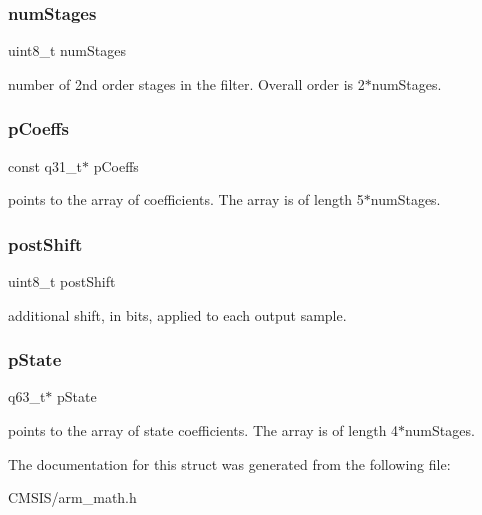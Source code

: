 \subsubsection{\texorpdfstring{numStages}{numStages}}
{\footnotesize\ttfamily uint8\+\_\+t num\+Stages}

number of 2nd order stages in the filter. Overall order is 2$\ast$num\+Stages. \mbox{\label{structarm__biquad__cas__df1__32x64__ins__q31_a80e7fdf4747dbda8eadb2663fb4be317}} 
\subsubsection{\texorpdfstring{pCoeffs}{pCoeffs}}
{\footnotesize\ttfamily const q31\+\_\+t$\ast$ p\+Coeffs}

points to the array of coefficients. The array is of length 5$\ast$num\+Stages. \mbox{\label{structarm__biquad__cas__df1__32x64__ins__q31_a74050e9f36542bd56f4052381a82ae8f}} 
\subsubsection{\texorpdfstring{postShift}{postShift}}
{\footnotesize\ttfamily uint8\+\_\+t post\+Shift}

additional shift, in bits, applied to each output sample. \mbox{\label{structarm__biquad__cas__df1__32x64__ins__q31_adefeb77301cc04e4d7d22f323029d588}} 
\subsubsection{\texorpdfstring{pState}{pState}}
{\footnotesize\ttfamily q63\+\_\+t$\ast$ p\+State}

points to the array of state coefficients. The array is of length 4$\ast$num\+Stages. 

The documentation for this struct was generated from the following file\+:\begin{DoxyCompactItemize}
\item 
C\+M\+S\+I\+S/arm\+\_\+math.\+h\end{DoxyCompactItemize}

